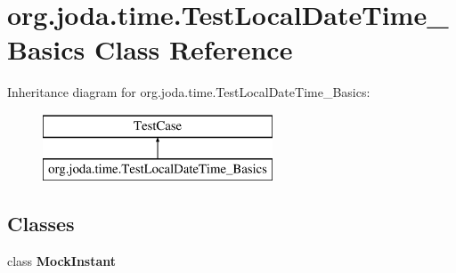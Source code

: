 \hypertarget{classorg_1_1joda_1_1time_1_1_test_local_date_time___basics}{\section{org.\-joda.\-time.\-Test\-Local\-Date\-Time\-\_\-\-Basics Class Reference}
\label{classorg_1_1joda_1_1time_1_1_test_local_date_time___basics}
}
Inheritance diagram for org.\-joda.\-time.\-Test\-Local\-Date\-Time\-\_\-\-Basics\-:\begin{figure}[H]
\begin{center}
\leavevmode
\includegraphics[height=2.000000cm]{classorg_1_1joda_1_1time_1_1_test_local_date_time___basics}
\end{center}
\end{figure}
\subsection*{Classes}
\begin{DoxyCompactItemize}
\item 
class {\bfseries Mock\-Instant}
\end{DoxyCompactItemize}
